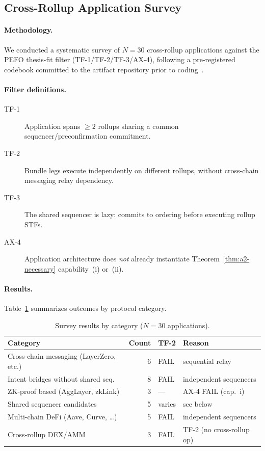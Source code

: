 
\subsection{Cross-Rollup Application Survey}
\label{app:survey}

\paragraph{Methodology.}
We conducted a systematic survey of $N=30$ cross-rollup applications
against the PEFO thesis-fit filter (TF-1/TF-2/TF-3/AX-4), following a
pre-registered codebook committed to the artifact repository prior to
coding~\cite{artifact-repo}.

\paragraph{Filter definitions.}
\begin{description}
  \item[TF-1] Application spans $\geq 2$ rollups sharing a common
    sequencer/preconfirmation commitment.
  \item[TF-2] Bundle legs execute independently on different rollups,
    without cross-chain messaging relay dependency.
  \item[TF-3] The shared sequencer is lazy: commits to ordering before
    executing rollup STFs.
  \item[AX-4] Application architecture does \emph{not} already instantiate
    Theorem~\ref{thm:a2-necessary} capability~(i) or~(ii).
\end{description}

\paragraph{Results.}
Table~\ref{tab:survey-summary} summarizes outcomes by protocol category.

\begin{table}[h]
\centering
\small
\caption{Survey results by category ($N=30$ applications).}
\label{tab:survey-summary}
\begin{tabular}{@{}lrll@{}}
\toprule
Category & Count & TF-2 & Reason \\
\midrule
Cross-chain messaging (LayerZero, etc.) & 6 & FAIL & sequential relay \\
Intent bridges without shared seq. & 8 & FAIL & independent sequencers \\
ZK-proof based (AggLayer, zkLink) & 3 & --- & AX-4 FAIL (cap.~i) \\
Shared sequencer candidates & 5 & varies & see below \\
Multi-chain DeFi (Aave, Curve, \ldots) & 5 & FAIL & independent sequencers \\
Cross-rollup DEX/AMM & 3 & FAIL & TF-2 (no cross-rollup op) \\
\bottomrule
\end{tabular}
\end{table}


